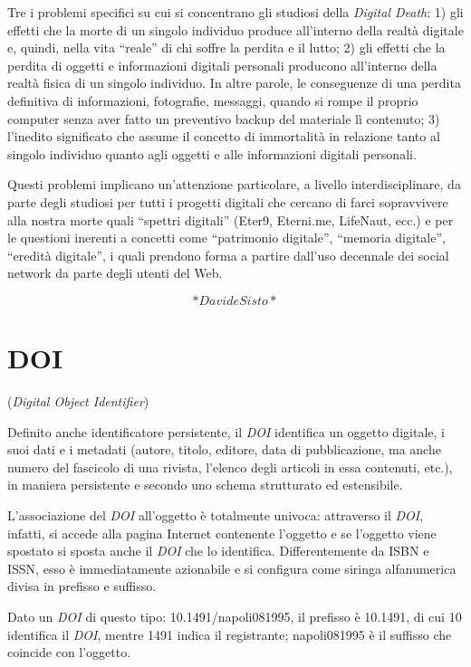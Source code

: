 \documentclass[
  b5paper,
  twoside,
  11pt,
  chapterprefix=false,
  bibliography=totocnumbered,
  parskip=0]{scrbook}
\begin{document}
Tre i problemi specifici su cui si concentrano gli studiosi della
\emph{Digital Death}: 1) gli effetti che la morte di un singolo individuo
produce all'interno della realtà digitale e, quindi, nella vita \enquote{reale}
di chi soffre la perdita e il lutto; 2) gli effetti che la perdita di
oggetti e informazioni digitali personali producono all'interno della
realtà fisica di un singolo individuo. In altre parole, le conseguenze
di una perdita definitiva di informazioni, fotografie, messaggi, quando
si rompe il proprio computer senza aver fatto un preventivo backup del
materiale lì contenuto; 3) l'inedito significato che assume il concetto
di immortalità in relazione tanto al singolo individuo quanto agli
oggetti e alle informazioni digitali personali.

Questi problemi implicano un'attenzione particolare, a livello
interdisciplinare, da parte degli studiosi per tutti i progetti digitali
che cercano di farci sopravvivere alla nostra morte quali \enquote{spettri
digitali} (Eter9, Eterni.me, LifeNaut, ecc.) e per le questioni inerenti
a concetti come \enquote{patrimonio digitale}, \enquote{memoria digitale}, \enquote{eredità
digitale}, i quali prendono forma a partire dall'uso decennale dei
social network da parte degli utenti del Web.

\[*Davide Sisto*\]

\hypertarget{doi}{%
\chapter{DOI}\label{doi}}

(\emph{Digital Object Identifier})

Definito anche identificatore persistente, il \emph{DOI} identifica un
oggetto digitale, i suoi dati e i metadati (autore, titolo, editore,
data di pubblicazione, ma anche numero del fascicolo di una rivista,
l'elenco degli articoli in essa contenuti, etc.), in maniera persistente
e secondo uno schema strutturato ed estensibile.

L'associazione del \emph{DOI} all'oggetto è totalmente univoca: attraverso il
\emph{DOI}, infatti, si accede alla pagina Internet contenente l'oggetto e se
l'oggetto viene spostato si sposta anche il \emph{DOI} che lo identifica.
Differentemente da ISBN e ISSN, esso è immediatamente azionabile e si
configura come siringa alfanumerica divisa in prefisso e suffisso.

Dato un \emph{DOI} di questo tipo: 10.1491/napoli081995, il prefisso è
10.1491, di cui 10 identifica il \emph{DOI}, mentre 1491 indica il
registrante; napoli081995 è il suffisso che coincide con l'oggetto.
\end{document}
